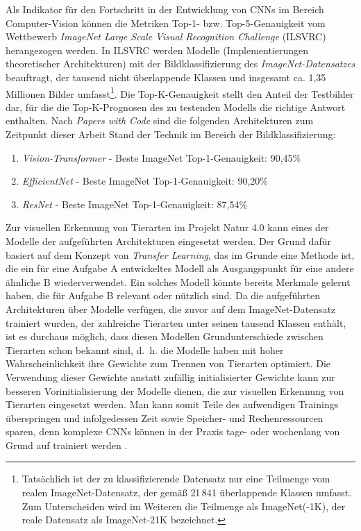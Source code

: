 Als Indikator für den Fortschritt in der Entwicklung von CNNs im Bereich Computer-Vision können die Metriken Top-1- bzw. Top-5-Genauigkeit vom Wettbewerb \emph{ImageNet Large Scale Visual Recognition Challenge} (ILSVRC) \cite{russakovsky2015imagenet} herangezogen werden. In ILSVRC werden Modelle (Implementierungen theoretischer Architekturen) mit der Bildklassifizierung des \emph{ImageNet-Datensatzes} beauftragt, der tausend nicht überlappende Klassen und insgesamt ca. 1,35 Millionen Bilder umfasst\footnote{Tatsächlich ist der zu klassifizierende Datensatz nur eine Teilmenge vom realen ImageNet-Datensatz, der gemäß \cite{ridnik2021imagenet21k} 21\,841 überlappende Klassen umfasst. Zum Unterscheiden wird im Weiteren die Teilmenge als ImageNet(-1K), der reale Datensatz als ImageNet-21K bezeichnet.}. Die Top-K-Genauigkeit stellt den Anteil der Testbilder dar, für die die Top-K-Prognosen des zu testenden Modells die richtige Antwort enthalten. Nach \emph{Papers with Code} \cite{PapersWithCode-ImageNet} sind die folgenden Architekturen zum Zeitpunkt dieser Arbeit Stand der Technik im Bereich der Bildklassifizierung:

\begin{enumerate}
	\item \emph{Vision-Transformer} \cite{dosovitskiy2021image} - Beste ImageNet Top-1-Genauigkeit: 90,45\%  \cite{zhai2021scaling}
	\item \emph{EfficientNet} \cite{tan2020efficientnet} - Beste ImageNet Top-1-Genauigkeit: 90,20\%  \cite{pham2021meta}
	\item \emph{ResNet} \cite{he2015deep} - Beste ImageNet Top-1-Genauigkeit: 87,54\% \cite{kolesnikov2020big}
\end{enumerate}

Zur visuellen Erkennung von Tierarten im Projekt Natur 4.0 kann eines der Modelle der aufgeführten Architekturen eingesetzt werden. Der Grund dafür basiert auf dem Konzept von \emph{Transfer Learning}, das im Grunde eine Methode ist, die ein für eine Aufgabe A entwickeltes Modell als Ausgangspunkt für eine andere ähnliche B wiederverwendet. Ein solches Modell könnte bereits Merkmale gelernt haben, die für Aufgabe B relevant oder nützlich sind. Da die aufgeführten Architekturen über Modelle verfügen, die zuvor auf dem ImageNet-Datensatz trainiert wurden, der zahlreiche Tierarten unter seinen tausend Klassen enthält, ist es durchaus möglich, dass diesen Modellen Grundunterschiede zwischen Tierarten schon bekannt sind, d.~h. die Modelle haben mit hoher Wahrscheinlichkeit ihre Gewichte zum Trennen von Tierarten optimiert. Die Verwendung dieser Gewichte anstatt zufällig initialisierter Gewichte kann zur besseren Vorinitialisierung der Modelle dienen, die zur visuellen Erkennung von Tierarten eingesetzt werden. Man kann somit Teile des aufwendigen Trainings überspringen und infolgedessen Zeit sowie Speicher- und Rechenressourcen sparen, denn komplexe CNNs können in der Praxis tage- oder wochenlang von Grund auf trainiert werden \cite[4]{Schroff_2015}\cite[1]{codreanu2017scale}\cite{BBVADeepLearning,StanfordDAWNBench}. 

